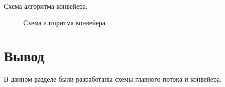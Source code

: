 Схема алгоритма конвейера:
\begin{figure}
	\caption{Схема алгоритма конвейера}
	\label{ZBufferWithThreads}
\end{figure}

\newpage
\section{Вывод}
В данном разделе были разработаны схемы главного потока и конвейера.
